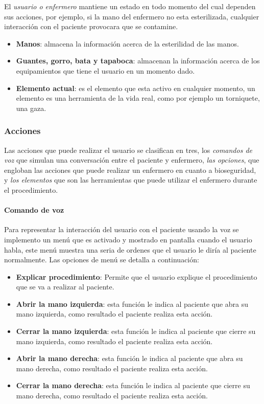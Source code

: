 El \emph{usuario o enfermero} mantiene un estado en todo momento del cual
dependen sus acciones, por ejemplo, si la mano del enfermero no esta
esterilizada, cualquier interacción con el paciente provocara que se
contamine.

\begin{itemize}
    \item \textbf{Manos}: almacena la información acerca de la esterilidad de
        las manos.
    \item \textbf{Guantes, gorro, bata y tapaboca}: almacenan la información
        acerca de los equipamientos que tiene el usuario en un momento dado.
    \item \textbf{Elemento actual}: es el elemento que esta activo en
        cualquier momento, un elemento es una herramienta de la vida real,
        como por ejemplo un torniquete, una gaza.
\end{itemize}

\subsubsection{Acciones}

Las acciones que puede realizar el usuario se clasifican en tres, los
\emph{comandos de voz} que simulan una conversación entre el paciente y
enfermero, \emph{las opciones}, que engloban las acciones que puede realizar un
enfermero en cuanto a bioseguridad, y \emph{los elementos} que son las
herramientas que puede utilizar el enfermero durante el procedimiento.

\paragraph{Comando de voz}

Para representar la interacción del usuario con el paciente usando la voz se
implemento un menú que es activado y mostrado en pantalla cuando el usuario
habla, este menú muestra una seria de ordenes que el usuario le diría al
paciente normalmente. Las opciones de menú se detalla a continuación:

\begin{itemize}
    \item \textbf{Explicar procedimiento}: Permite que el usuario explique el
        procedimiento que se va a realizar al paciente. 
\item \textbf{Abrir la mano izquierda}: esta función le indica al paciente que
    abra su mano izquierda, como resultado el paciente realiza esta acción.
\item \textbf{Cerrar la mano izquierda}: esta función le indica al paciente que
    cierre su mano izquierda, como resultado el paciente realiza esta acción.
\item \textbf{Abrir la mano derecha}: esta función le indica al paciente que
    abra su mano derecha, como resultado el paciente realiza esta acción.
\item \textbf{Cerrar la mano derecha}: esta función le indica al paciente que
    cierre su mano derecha, como resultado el paciente realiza esta acción.
\end{itemize}

